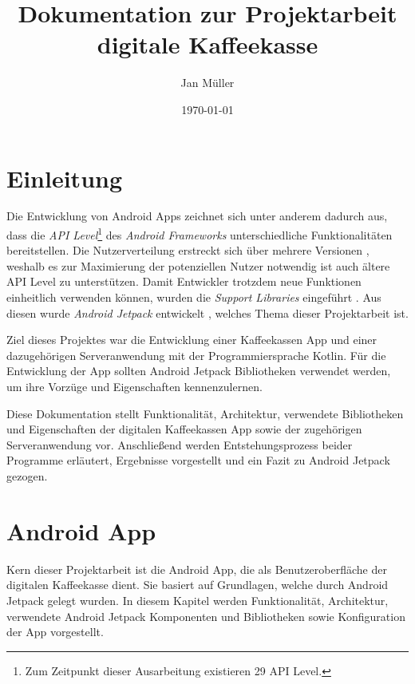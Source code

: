 \documentclass[a4paper, 11pt]{article}
\title{Dokumentation zur Projektarbeit digitale Kaffeekasse}
\author{Jan Müller}
\date{\today}
\begin{document}
\maketitle

\section{Einleitung}
\label{sec:intro}
Die Entwicklung von Android Apps zeichnet sich unter anderem dadurch aus, dass die \textit{API Level}\footnote{Zum Zeitpunkt dieser Ausarbeitung existieren 29 API Level.} des \textit{Android Frameworks} unterschiedliche Funktionalitäten bereitstellen.
Die Nutzerverteilung erstreckt sich über mehrere Versionen \autocite{androidhistory}, weshalb es zur Maximierung der potenziellen Nutzer notwendig ist auch ältere API Level zu unterstützen.
Damit Entwickler trotzdem neue Funktionen einheitlich verwenden können, wurden die \textit{Support Libraries} eingeführt \autocite{supportlibraries}.
Aus diesen wurde \textit{Android Jetpack} entwickelt \autocite{androidjetpack}, welches Thema dieser Projektarbeit ist.

Ziel dieses Projektes war die Entwicklung einer Kaffeekassen App und einer dazugehörigen Serveranwendung mit der Programmiersprache Kotlin.
Für die Entwicklung der App sollten Android Jetpack Bibliotheken verwendet werden, um ihre Vorzüge und Eigenschaften kennenzulernen.

Diese Dokumentation stellt Funktionalität, Architektur, verwendete Bibliotheken und Eigenschaften der digitalen Kaffeekassen App sowie der zugehörigen Serveranwendung vor.
Anschließend werden Entstehungsprozess beider Programme erläutert, Ergebnisse vorgestellt und ein Fazit zu Android Jetpack gezogen.

\section{Android App}
\label{sec:app}
Kern dieser Projektarbeit ist die Android App, die als Benutzeroberfläche der digitalen Kaffeekasse dient.
Sie basiert auf Grundlagen, welche durch Android Jetpack gelegt wurden.
In diesem Kapitel werden Funktionalität, Architektur, verwendete Android Jetpack Komponenten und Bibliotheken sowie Konfiguration der App vorgestellt.
\end{document}
